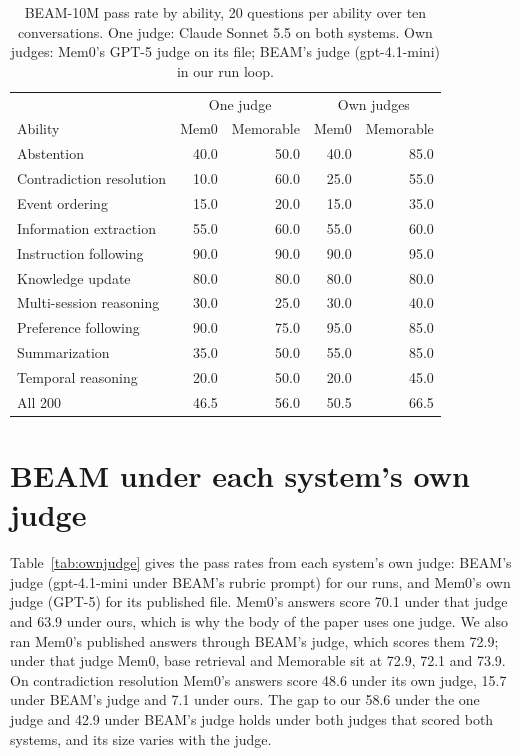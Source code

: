 \begin{table}[H]
\caption{BEAM-10M pass rate by ability, 20 questions per ability over ten conversations. One judge: Claude Sonnet 5.5 on both systems. Own judges: Mem0's GPT-5 judge on its file; BEAM's judge (gpt-4.1-mini) in our run loop.}
\label{tab:beam10m}
\small
\centering
\setlength{\tabcolsep}{5pt}
\begin{tabular}{@{}lrrrr@{}}
\toprule
 & \multicolumn{2}{c}{One judge} & \multicolumn{2}{c}{Own judges} \\
Ability & Mem0 & Memorable & Mem0 & Memorable \\
\midrule
Abstention & 40.0 & 50.0 & 40.0 & 85.0 \\
Contradiction resolution & 10.0 & 60.0 & 25.0 & 55.0 \\
Event ordering & 15.0 & 20.0 & 15.0 & 35.0 \\
Information extraction & 55.0 & 60.0 & 55.0 & 60.0 \\
Instruction following & 90.0 & 90.0 & 90.0 & 95.0 \\
Knowledge update & 80.0 & 80.0 & 80.0 & 80.0 \\
Multi-session reasoning & 30.0 & 25.0 & 30.0 & 40.0 \\
Preference following & 90.0 & 75.0 & 95.0 & 85.0 \\
Summarization & 35.0 & 50.0 & 55.0 & 85.0 \\
Temporal reasoning & 20.0 & 50.0 & 20.0 & 45.0 \\
\midrule
All 200 & 46.5 & 56.0 & 50.5 & 66.5 \\
\bottomrule
\end{tabular}
\end{table}

\section{BEAM under each system's own judge}
\label{app:ownjudge}

Table~\ref{tab:ownjudge} gives the pass rates from each system's own judge: BEAM's judge (gpt-4.1-mini under BEAM's rubric prompt) for our runs, and Mem0's own judge (GPT-5) for its published file. Mem0's answers score 70.1 under that judge and 63.9 under ours, which is why the body of the paper uses one judge. We also ran Mem0's published answers through BEAM's judge, which scores them 72.9; under that judge Mem0, base retrieval and Memorable sit at 72.9, 72.1 and 73.9. On contradiction resolution Mem0's answers score 48.6 under its own judge, 15.7 under BEAM's judge and 7.1 under ours. The gap to our 58.6 under the one judge and 42.9 under BEAM's judge holds under both judges that scored both systems, and its size varies with the judge.

